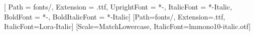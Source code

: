 \newcommand{\DocsImageAbove}{3.25}   %
\newcommand{\CaptionLineDelta}{(\DocsPitch{\SubtitleSize}-\DocsPitch[1.5]{\SubtitleSize})}
\newcommand{\LatexCaptionTop}{\fpeval{5.5+0.69*\CaptionLineDelta}}     %
\newcommand{\LatexCaptionBottom}{\fpeval{3.75+0.30*\CaptionLineDelta}} %
\newcommand{\LatexTableCaption}{\fpeval{2.75+0.28*\CaptionLineDelta}}  %
\newcommand{\LatexLongTableTop}{\fpeval{2.75+0.17*\CaptionLineDelta}}  %

\newcommand{\FigureCaptionGap}{\fpeval{\CaptionGap-\LatexCaptionTop}}
\newcommand{\SubfigureGap}{\fpeval{\DocsTextOffset{\SubtitleSize}
  +max(\SubtitleAfter,0)+\DocsImageAbove-\LatexCaptionBottom}}
\newcommand{\TableCaptionGap}{\fpeval{\CaptionGap-\LatexTableCaption}}

\usepackage{iftex}
\expandafter\usepackage\expandafter[\PageSetup]{geometry}

\ifPDFTeX
  \newcommand{\titleweight}{\mdseries}
\else
  \usepackage{lmodern}               %
  \usepackage{fontspec}
  \setmainfont{Lora}[
    Path           = fonts/,
    Extension      = .ttf,
    UprightFont    = *-\BodyWeight,
    ItalicFont     = *-Italic,
    BoldFont       = *-\BoldWeight,
    BoldItalicFont = *-\BoldWeight Italic]
  \newfontfamily{\titleweight}{Lora-\TitleWeight}[Path=fonts/, Extension=.ttf,
                                       ItalicFont=Lora-\TitleWeight Italic]
  \setmonofont{lmmono10-regular.otf}[Scale=MatchLowercase,
                                     ItalicFont=lmmono10-italic.otf]
\fi

